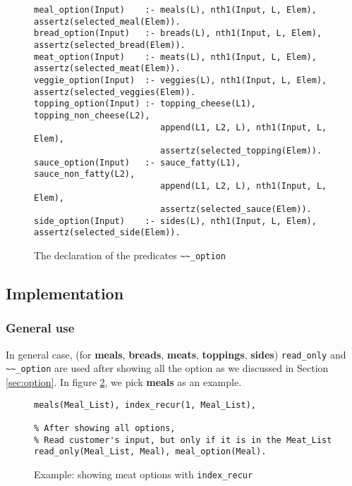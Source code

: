 \documentclass[12pt,a4paper]{article}
\newcommand{\varname}[1]{\texttt{#1}}
\newcommand{\predname}[1]{{\color{MidnightBlue}\varname{#1}}}
\begin{document}
\begin{figure}[H]
	\centering
\begin{lstlisting}[style=Prolog-pygsty]
% Define all ~~~_option
meal_option(Input)    :- meals(L), nth1(Input, L, Elem), assertz(selected_meal(Elem)).
bread_option(Input)   :- breads(L), nth1(Input, L, Elem), assertz(selected_bread(Elem)).
meat_option(Input)    :- meats(L), nth1(Input, L, Elem), assertz(selected_meat(Elem)).
veggie_option(Input)  :- veggies(L), nth1(Input, L, Elem), assertz(selected_veggies(Elem)).
topping_option(Input) :- topping_cheese(L1), topping_non_cheese(L2), 
    					 append(L1, L2, L), nth1(Input, L, Elem), 
    					 assertz(selected_topping(Elem)).
sauce_option(Input)   :- sauce_fatty(L1), sauce_non_fatty(L2), 
    					 append(L1, L2, L), nth1(Input, L, Elem), 
    					 assertz(selected_sauce(Elem)).
side_option(Input)    :- sides(L), nth1(Input, L, Elem), assertz(selected_side(Elem)).

\end{lstlisting}
	\caption{The declaration of the predicates \predname{\~{}\~{}\_option}} 
	\label{fig:readoption}
\end{figure}





\newpage
\subsection{Implementation}

\subsubsection{General use}
\label{sec:general}

In general case, (for \textbf{meals}, \textbf{breads}, \textbf{meats}, \textbf{toppings}, \textbf{sides}) \predname{read\_only} and \predname{\~{}\~{}\_option} are used after showing all the option as we discussed in Section \ref{sec:option}. In figure \ref{fig:general}, we pick \textbf{meals} as an example. \\ 


\begin{figure}[H]
	\centering
\begin{lstlisting}[style=Prolog-pygsty]
% Showing all meats options
meals(Meal_List), index_recur(1, Meal_List),

% After showing all options, 
% Read customer's input, but only if it is in the Meat_List
read_only(Meal_List, Meal), meal_option(Meal).
\end{lstlisting}
	\caption{Example: showing meat options with \predname{index\_recur}} 
	\label{fig:general}
\end{figure}
\end{document}
